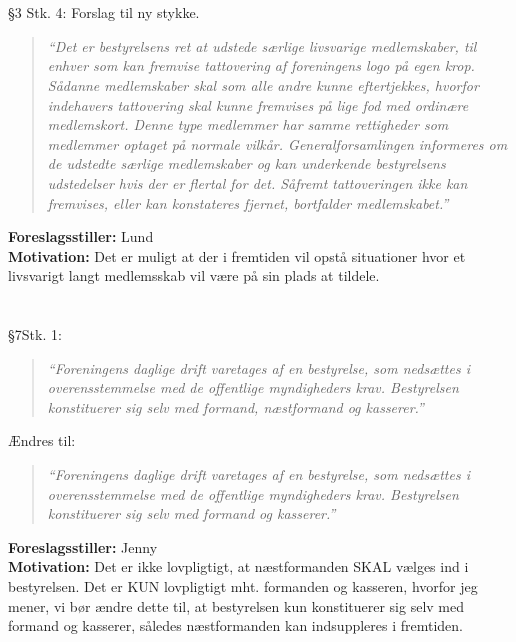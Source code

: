 \documentclass[a4paper,12pt,danish]{article}
\newcommand\cit[1]{
    \begin{quote}
        \textit{``#1''}
    \end{quote}
}
\newcommand\who[1]{
    \textbf{Foreslagsstiller:} #1\\
}
\newcommand\why[1]{
    \textbf{Motivation:} #1\\
}
\newcommand\change[1]{
    \section{}
    #1
}
\begin{document}
\change{
	\S3 Stk. 4:
Forslag til ny stykke.
    \cit{Det er bestyrelsens ret at udstede særlige livsvarige medlemskaber, til enhver som kan fremvise tattovering af foreningens logo på egen krop. Sådanne medlemskaber skal som alle andre kunne eftertjekkes, hvorfor indehavers tattovering skal kunne fremvises på lige fod med ordinære medlemskort. Denne type medlemmer har samme rettigheder som medlemmer optaget på normale vilkår. Generalforsamlingen informeres om de udstedte særlige medlemskaber og kan underkende bestyrelsens udstedelser hvis der er flertal for det. Såfremt tattoveringen ikke kan fremvises, eller kan konstateres fjernet, bortfalder medlemskabet.}
    \who{Lund}
    \why{Det er muligt at der i fremtiden vil opstå situationer hvor et livsvarigt langt medlemsskab vil være på sin plads at tildele.}
}

\change{
	\S7Stk. 1:
    \cit{Foreningens daglige drift varetages af en bestyrelse, som nedsættes i overensstemmelse med de offentlige myndigheders krav. Bestyrelsen konstituerer sig selv med formand, næstformand og kasserer.}
    Ændres til:
    \cit{Foreningens daglige drift varetages af en bestyrelse, som nedsættes i overensstemmelse med de offentlige myndigheders krav. Bestyrelsen konstituerer sig selv med formand og kasserer.}
    \who{Jenny}
    \why{Det er ikke lovpligtigt, at næstformanden SKAL vælges ind i bestyrelsen. Det er KUN lovpligtigt mht. formanden og kasseren, hvorfor jeg mener, vi bør ændre dette til, at bestyrelsen kun konstituerer sig selv med formand og kasserer, således næstformanden kan indsuppleres i fremtiden.}
}
\end{document}
